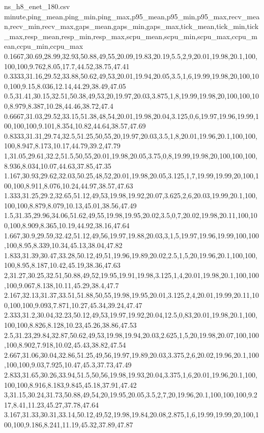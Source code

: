 \begin{filecontents*}[overwrite]{ns_h8_enet_180.csv}
minute,ping_mean,ping_min,ping_max,p95_mean,p95_min,p95_max,recv_mean,recv_min,recv_max,gaps_mean,gaps_min,gaps_max,tick_mean,tick_min,tick_max,resp_mean,resp_min,resp_max,scpu_mean,scpu_min,scpu_max,ccpu_mean,ccpu_min,ccpu_max
0.1667,30.69,28.99,32.93,50.88,49,55,20.09,19.83,20.19,5.5,2,9,20.01,19.98,20.1,100,100,100,9.762,8.05,17.7,44.52,38.75,47.41
0.3333,31.16,29.52,33.88,50.62,49,53,20.01,19.94,20.05,3.5,1,6,19.99,19.98,20,100,100,100,9.15,8.036,12.14,44.29,38.49,47.05
0.5,31.41,30.15,32.51,50.38,49,53,20,19.97,20.03,3.875,1,8,19.99,19.98,20,100,100,100,8.979,8.387,10.28,44.46,38.72,47.4
0.6667,31.03,29.52,33.15,51.38,48,54,20.01,19.98,20.04,3.125,0,6,19.97,19.96,19.99,100,100,100,9.101,8.354,10.82,44.64,38.57,47.69
0.8333,31.31,29.74,32.5,51.25,50,55,20,19.97,20.03,3.5,1,8,20.01,19.96,20.1,100,100,100,8.947,8.173,10.17,44.79,39.2,47.79
1,31.05,29.61,32.2,51.5,50,55,20.01,19.98,20.05,3.75,0,8,19.99,19.98,20,100,100,100,8.936,8.034,10.07,44.63,37.85,47.35
1.167,30.93,29.62,32.03,50.25,48,52,20.01,19.98,20.05,3.125,1,7,19.99,19.99,20,100,100,100,8.911,8.076,10.24,44.97,38.57,47.63
1.333,31.25,29.2,32.65,51.12,49,53,19.98,19.92,20.07,3.625,2,6,20.03,19.99,20.1,100,100,100,8.879,8.079,10.13,45.01,38.56,47.49
1.5,31.35,29.96,34.06,51.62,49,55,19.98,19.95,20.02,3.5,0,7,20.02,19.98,20.11,100,100,100,8.909,8.365,10.19,44.92,38.16,47.64
1.667,30.9,29.59,32.42,51.12,49,56,19.97,19.88,20.03,3,1,5,19.97,19.96,19.99,100,100,100,8.95,8.339,10.34,45.13,38.04,47.82
1.833,31.39,30.47,33.28,50.12,49,51,19.96,19.89,20.02,2.5,1,5,20,19.96,20.1,100,100,100,8.95,8.187,10.42,45.19,38.36,47.63
2,31.27,30.25,32.51,50.88,49,52,19.95,19.91,19.98,3.125,1,4,20.01,19.98,20.1,100,100,100,9.067,8.138,10.11,45.29,38.4,47.7
2.167,32.13,31.37,33.51,51.88,50,55,19.98,19.95,20.01,3.125,2,4,20.01,19.99,20.11,100,100,100,9.093,7.871,10.27,45.34,39.24,47.47
2.333,31.2,30.04,32.23,50.12,49,53,19.97,19.92,20.04,12.5,0,83,20.01,19.98,20.1,100,100,100,8.826,8.128,10.23,45.26,38.86,47.53
2.5,31.23,29.84,32.87,50.62,49,53,19.98,19.94,20.03,2.625,1,5,20,19.98,20.07,100,100,100,8.902,7.918,10.02,45.43,38.82,47.54
2.667,31.06,30.04,32.86,51.25,49,56,19.97,19.89,20.03,3.375,2,6,20.02,19.96,20.1,100,100,100,9.03,7.925,10.47,45.3,37.73,47.49
2.833,31.65,30.26,33.94,51.5,50,56,19.98,19.93,20.04,3.375,1,6,20.01,19.96,20.1,100,100,100,8.916,8.183,9.845,45.18,37.91,47.42
3,31.15,30.24,31.73,50.88,49,54,20,19.95,20.05,3.5,2,7,20,19.96,20.1,100,100,100,9.217,8.41,11.23,45.27,37.78,47.64
3.167,31.33,30.31,33.14,50.12,49,52,19.98,19.84,20.08,2.875,1,6,19.99,19.99,20,100,100,100,9.186,8.241,11.19,45.32,37.89,47.87

\end{filecontents*}
